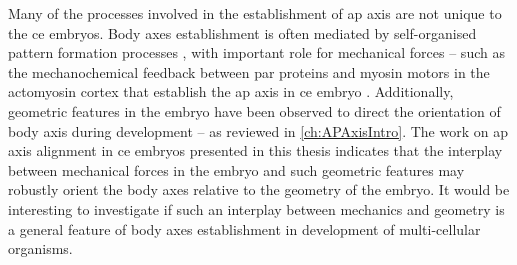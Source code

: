 Many of the processes involved in the establishment of \ac{ap} axis are not unique to the \ac{ce} embryos. Body axes establishment is often mediated by self-organised pattern formation processes \citep{GerhartKirschnerCells,goldstein1997axis}, with important role for mechanical forces \citep{sagyMechanicsOrganoid,etoc2016balance,zhang2019mouse,gross2017active,munster2018integrin} -- such as the mechanochemical feedback between \ac{par} proteins and myosin motors in the actomyosin cortex that establish the \ac{ap} axis in \ac{ce} embryo \citep{gross2019guiding}. Additionally, geometric features in the embryo have been observed to direct the orientation of body axis during development -- as reviewed in \autoref{ch:APAxisIntro}. The work on \ac{ap} axis alignment in \ac{ce} embryos presented in this thesis indicates that the interplay between mechanical forces in the embryo and such geometric features may robustly orient the body axes relative to the geometry of the embryo. It would be interesting to investigate if such an interplay between mechanics and geometry is a general feature of body axes establishment in development of multi-cellular organisms.


